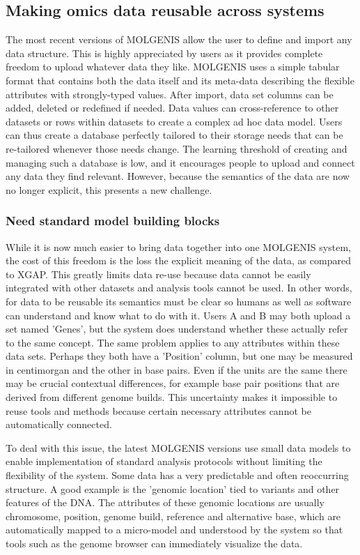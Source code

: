 \subsection{Making omics data reusable across systems} \label{modelsection_reusable}

The most recent versions of MOLGENIS allow the user to define and import any data structure.
This is highly appreciated by users as it provides complete freedom to upload whatever data they like.
MOLGENIS uses a simple tabular format that contains both the data itself and its meta-data describing the flexible attributes with strongly-typed values.
After import, data set columns can be added, deleted or redefined if needed.
Data values can cross-reference to other datasets or rows within datasets to create a complex ad hoc data model.
Users can thus create a database perfectly tailored to their storage needs that can be re-tailored whenever those needs change.
The learning threshold of creating and managing such a database is low, and it encourages people to upload and connect any data they find relevant.
However, because the semantics of the data are now no longer explicit, this presents a new challenge.

\subsubsection*{Need standard model building blocks}

While it is now much easier to bring data together into one MOLGENIS system, the cost of this freedom is the loss the explicit meaning of the data, as compared to XGAP.
This greatly limits data re-use because data cannot be easily integrated with other datasets and analysis tools cannot be used.
In other words, for data to be reusable its semantics must be clear so humans as well as software can understand and know what to do with it. 
Users A and B may both upload a set named 'Genes', but the system does understand whether these actually refer to the same concept.
The same problem applies to any attributes within these data sets.
Perhaps they both have a 'Position' column, but one may be measured in centimorgan and the other in base pairs.
Even if the units are the same there may be crucial contextual differences, for example base pair positions that are derived from different genome builds.
This uncertainty makes it impossible to reuse tools and methods because certain necessary attributes cannot be automatically connected.

To deal with this issue, the latest MOLGENIS versions use small data models to enable implementation of standard analysis protocols without limiting the flexibility of the system.
Some data has a very predictable and often reoccurring structure. A good example is the 'genomic location’ tied to variants and other features of the DNA.
The attributes of these genomic locations are usually chromosome, position, genome build, reference and alternative base, which are automatically mapped to a micro-model and understood by the system so that tools such as the genome browser can immediately visualize the data.

